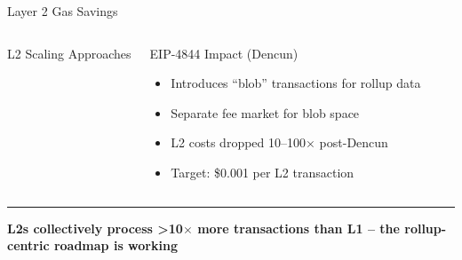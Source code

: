 \documentclass[8pt,aspectratio=169]{beamer}
\newcommand{\bottomnote}[1]{\vfill\vspace{-2mm}\textcolor{mllavender2}{\rule{\textwidth}{0.4pt}}\vspace{1mm}\footnotesize\textbf{#1}}
\begin{document}
\begin{frame}{Layer 2 Gas Savings}
\begin{columns}
\begin{block}{L2 Scaling Approaches}
\begin{itemize}
\begin{itemize}
    \end{itemize}
\end{itemize}
\end{block}
\vspace{2mm}
\begin{block}{EIP-4844 Impact (Dencun)}
\begin{itemize}\small
  \item Introduces ``blob'' transactions for rollup data
  \item Separate fee market for blob space
  \item L2 costs dropped 10--100$\times$ post-Dencun
  \item Target: \$0.001 per L2 transaction
\end{itemize}
\end{block}
\end{columns}
\bottomnote{L2s collectively process >10$\times$ more transactions than L1 -- the rollup-centric roadmap is working}
\end{frame}
\end{document}

